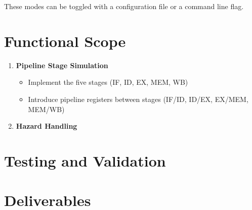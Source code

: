 \documentclass{article}
\begin{document}
These modes can be toggled with a configuration file or a command line flag.

\section{Functional Scope}
\begin{enumerate}
    \item \textbf{Pipeline Stage Simulation}
    \begin{itemize}
        \item Implement the five stages (IF, ID, EX, MEM, WB)
        \item Introduce pipeline registers between stages (IF/ID, ID/EX, EX/MEM, MEM/WB)
    \end{itemize}

    \item \textbf{Hazard Handling}
    
\end{enumerate}

\section{Testing and Validation}
\section{Deliverables}
\end{document}
